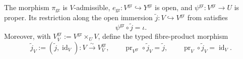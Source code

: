 \begin{lemma}
  \label{lemma:nagata-graph-extension}

  The morphism $\pi_{\mathrm{gr}}$ is $V$-admissible,
  $e_{\mathrm{gr}}\colon V^{\mathrm{gr}}\hookrightarrow Y^{\mathrm{gr}}$ is
  open, and
  $\psi^{\mathrm{gr}}\colon V^{\mathrm{gr}}\to U$ is proper.  Its
  restriction along the open immersion
  $\widetilde j\colon V\hookrightarrow V^{\mathrm{gr}}$ from
   satisfies
  \[
    \psi^{\mathrm{gr}}\circ\widetilde j=\iota.
  \]
  Moreover, with
  $V^{\mathrm{gr}}_V:=V^{\mathrm{gr}}\times_UV$, define the typed
  fibre-product morphism
  \[
    \widetilde j_V:=(\widetilde j,\operatorname{id}_V)
      \colon V\xrightarrow{\sim}V^{\mathrm{gr}}_V,\qquad
    \operatorname{pr}_{V^{\mathrm{gr}}}\circ\widetilde j_V
        =\widetilde j,\qquad
    \operatorname{pr}_V\circ\widetilde j_V=\operatorname{id}_V.
  \]
\end{lemma}

